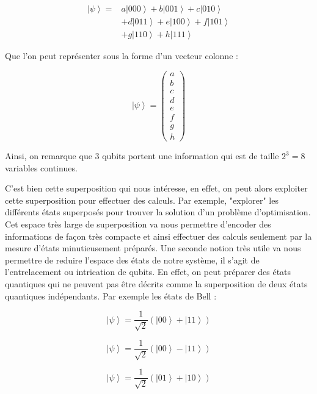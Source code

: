 \documentclass{article}
\begin{document}
\begin{multicols}{2}
\begin{align}
    \left|\psi\right> = & a\left|000\right> + b\left|001\right> + c\left|010\right> \nonumber \\
    & + d\left|011\right> + e\left|100\right> + f\left|101\right> \nonumber \\
    & + g\left|110\right> + h\left|111\right>
\end{align}

Que l'on peut représenter sous la forme d'un vecteur colonne :

\begin{equation}
    \left|\psi\right> = \begin{pmatrix} a \\ b \\ c \\ d \\ e \\ f \\ g \\ h \end{pmatrix}
\end{equation}


Ainsi, on remarque que 3 qubits portent une information qui est de taille $2^3 = 8$ variables continues.

C'est bien cette superposition qui nous intéresse, en effet, on peut alors exploiter cette superposition pour effectuer des calculs. Par exemple, "explorer" les différents états superposés pour trouver la solution d'un problème d'optimisation.
Cet espace très large de superposition va nous permettre d'encoder des informations de façon très compacte et ainsi effectuer des calculs seulement par la mesure d'états minutieusement préparés.
Une seconde notion très utile va nous permettre de reduire l'espace des états de notre système, il s'agit de l'entrelacement ou intrication de qubits.
En effet, on peut préparer des états quantiques qui ne peuvent pas être décrits comme la superposition de deux états quantiques indépendants. 
Par exemple les états de Bell :

\begin{equation}
    \left|\psi\right> = \frac{1}{\sqrt{2}}\left(\left|00\right> + \left|11\right>\right)
\end{equation}

\begin{equation}
    \left|\psi\right> = \frac{1}{\sqrt{2}}\left(\left|00\right> - \left|11\right>\right)
\end{equation}

\begin{equation}
    \left|\psi\right> = \frac{1}{\sqrt{2}}\left(\left|01\right> + \left|10\right>\right)
\end{equation}


\end{multicols}
\end{document}
